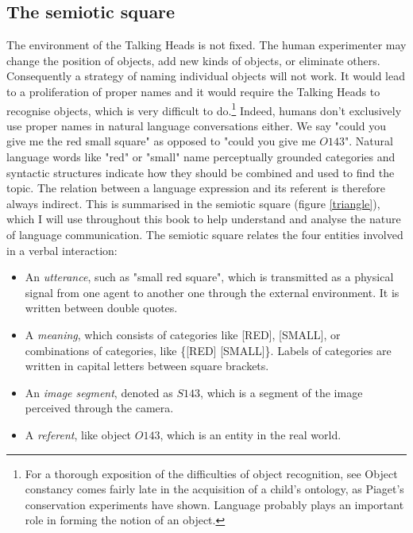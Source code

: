 \subsection{The semiotic square}

The environment of the Talking Heads is 
not fixed. The human experimenter 
may change the position of objects, add new kinds of 
objects, or eliminate
others. Consequently a strategy of naming individual objects
will not work. It would lead to a proliferation of 
proper names and it would require the Talking Heads to
recognise objects, which is very difficult to do.\footnote{
For a thorough exposition of the difficulties of 
object recognition, see \cite{Ullman:1996}
Object constancy comes fairly late in the 
acquisition of a child's ontology, as Piaget's conservation
experiments have shown. Language probably plays an important
role in forming the notion of an object.}
Indeed, humans don't exclusively use proper names in 
natural language conversations 
either. We say "could you give me the red small square" as 
opposed to "could you give me $O143$". Natural language 
words like "red" or "small" name perceptually grounded categories
and syntactic structures indicate how they should
be combined and used to find the topic. The relation between 
a language expression and its referent is therefore 
always indirect. This is summarised
in the semiotic square (figure \ref{triangle}), which I will use throughout this book to 
help understand and analyse the nature of language communication. 
The semiotic square relates the four entities
involved in a verbal interaction: 
\begin{itemize}
\item An {\it utterance}, such as "small red square", which is 
transmitted as a physical 
signal from one agent to another one through the 
external environment. It is written between double quotes. 
\item A {\it meaning}, which consists of categories like [RED], [SMALL], 
or combinations of categories, like \{[RED] [SMALL]\}. Labels of 
categories are written in capital letters between 
square brackets. 
\item An {\it image segment}, denoted as $S143$, which is 
a segment of the image perceived through the camera.
\item A {\it referent}, like object $O143$, which is 
an entity in the real world. 
\end{itemize}

